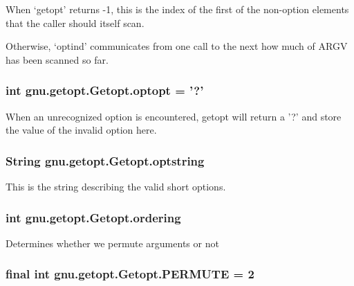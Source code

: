 When `getopt' returns -\/1, this is the index of the first of the non-\/option elements that the caller should itself scan.

Otherwise, `optind' communicates from one call to the next how much of ARGV has been scanned so far. \hypertarget{classgnu_1_1getopt_1_1_getopt_ac9bb6ef79a5d0467f38cdf2ac07c51ef}{
\subsubsection[{optopt}]{\setlength{\rightskip}{0pt plus 5cm}int {\bf gnu.getopt.Getopt.optopt} = '?'}}
\label{classgnu_1_1getopt_1_1_getopt_ac9bb6ef79a5d0467f38cdf2ac07c51ef}
When an unrecognized option is encountered, getopt will return a '?' and store the value of the invalid option here. \hypertarget{classgnu_1_1getopt_1_1_getopt_a3a731b226188580b7cf0928b97d0502d}{
\subsubsection[{optstring}]{\setlength{\rightskip}{0pt plus 5cm}String {\bf gnu.getopt.Getopt.optstring}}}
\label{classgnu_1_1getopt_1_1_getopt_a3a731b226188580b7cf0928b97d0502d}
This is the string describing the valid short options. \hypertarget{classgnu_1_1getopt_1_1_getopt_a9512cc64df132d096957ae7f24f5480d}{
\subsubsection[{ordering}]{\setlength{\rightskip}{0pt plus 5cm}int {\bf gnu.getopt.Getopt.ordering}}}
\label{classgnu_1_1getopt_1_1_getopt_a9512cc64df132d096957ae7f24f5480d}
Determines whether we permute arguments or not \hypertarget{classgnu_1_1getopt_1_1_getopt_a40d611d25b27cb29cc6f3791882652ab}{
\subsubsection[{PERMUTE}]{\setlength{\rightskip}{0pt plus 5cm}final int {\bf gnu.getopt.Getopt.PERMUTE} = 2}}
